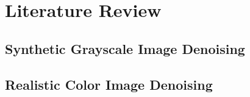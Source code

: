 %
\chapter{Literature Review}
\label{sec:review}


\blindtext

\section{Synthetic Grayscale Image Denoising}
\label{sec:review:sys}

\blindtext

\section{Realistic Color Image Denoising}
\label{sec:review:feature}

\blindtext

